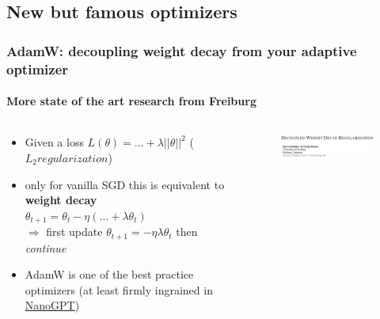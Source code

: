 \documentclass[
	11pt, %
	aspectratio=169, %
]{beamer}
\begin{document}

\subsection{New but famous optimizers}

\begin{frame}
	\frametitle{AdamW: decoupling weight decay from your adaptive optimizer}
	\framesubtitle{More state of the art research from Freiburg}
	 \begin{columns}[c] %
		\begin{column}{0.55\textwidth} %
			\begin{itemize}
				\item Given a loss $L(\theta) = \hdots + \lambda \vert \vert \theta \vert \vert^2 $ ($L_2 regularization$)
				\item only for vanilla SGD this is equivalent to \textbf{weight decay} \\
				 $\theta_{t+1} = \theta_t - \eta( \dots + \lambda \theta_t) $\\
				 \vspace{1em}
				 $\Longrightarrow$ first update $\theta_{t+1} = -\eta \lambda \theta_t$ then \textit{continue}
				 \item AdamW is one of the best practice optimizers (at least firmly ingrained in \href{https://github.com/karpathy/nanoGPT}{NanoGPT})

			\end{itemize}
		\end{column}
		\begin{column}{0.35\textwidth} %
        	\begin{figure}
        	    \centering
                \includegraphics[width=8cm]{figures/adamw.png}
        	    \caption*{}
        	\end{figure}
		\end{column}
	\end{columns}
\end{frame}
\end{document}
